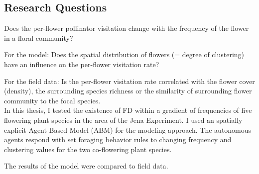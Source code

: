 \subsection{Research Questions}

Does the per-flower pollinator visitation change with the frequency of the flower in a floral community? 

For the model: Does the spatial distribution of flowers (= degree of clustering) have an influence on the per-flower visitation rate?

For the field data: Is the per-flower visitation rate correlated with the flower cover (density), the surrounding species richness or the similarity of surrounding flower community to the focal species.\\

In this thesis, I tested the existence of FD within a gradient of frequencies of five flowering plant species in the area of the Jena Experiment. I used an spatially explicit Agent-Based Model (ABM) for the modeling approach. The autonomous agents respond with set foraging behavior rules to changing frequency and clustering values for the two co-flowering plant species. 

The results of the model were compared to field data.

